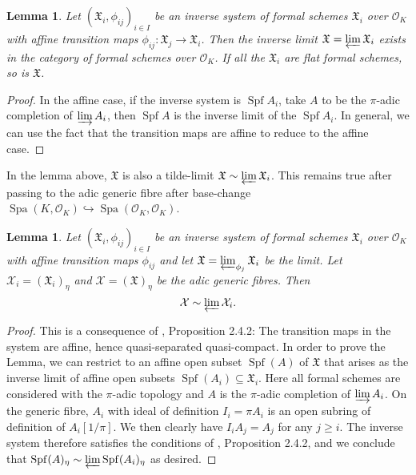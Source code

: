 \documentclass[10pt,oneside]{amsart}
\newtheorem{lemma}[theorem]{Lemma}
\theoremstyle{definition}
\begin{document}
	\begin{lemma} \label{lemma:inverse_limit_formal}
		Let $(\mathfrak X_i,\phi_{ij})_{i\in I}$ be an inverse system of formal schemes $\mathfrak X_i$ over $\mathcal O_K$ with affine transition maps $\phi_{ij}:\mathfrak X_j\rightarrow \mathfrak X_i$. Then the inverse limit $\mathfrak X=\varprojlim \mathfrak X_i$ exists in the category of formal schemes over $\mathcal O_K$. If all the $\mathfrak X_i$ are flat formal schemes, so is $\mathfrak X$.
	\end{lemma}
	\begin{proof}
	In the affine case, if the inverse system is $\operatorname{Spf} A_i$, take $A$ to be the $\pi$-adic completion of $\varinjlim A_i$, then  $\operatorname{Spf} A$ is the inverse limit of the $\operatorname{Spf}A_i$. In general, we can use the fact that the transition maps are affine to reduce to the affine case. 
	\end{proof}
	
	In the lemma above, $\mathfrak X$ is also a tilde-limit  $\mathfrak X\sim \varprojlim \mathfrak X_i$. This remains true after passing to the adic generic fibre after base-change $\operatorname{Spa}(K,\mathcal O_K)\hookrightarrow \operatorname{Spa}(\mathcal O_K,\mathcal O_K)$.
	
	\begin{lemma}\label{tilde-limit from adic generic fibre of formal schemes}
		Let $(\mathfrak X_i,\phi_{ij})_{i\in I}$ be an inverse system of formal schemes $\mathfrak X_i$ over $\mathcal O_K$ with affine transition maps $\phi_{ij}$ and let $\mathfrak X=\varprojlim_{\phi_j} \mathfrak X_i$ be the limit. Let $\mathcal X_i =(\mathfrak X_i)_\eta$ and  $\mathcal X = (\mathfrak X)_\eta$ be the adic generic fibres. Then
		\[\mathcal X \sim \varprojlim \mathcal X_i.\]
	\end{lemma}
	\begin{proof}
		This is a consequence of \cite{SW}, Proposition 2.4.2: The transition maps in the system are affine, hence quasi-separated quasi-compact. In order to prove the Lemma, we can restrict to an affine open subset $\operatorname{Spf}(A)$ of $\mathfrak X$ that arises as the inverse limit of affine open subsets $\operatorname{Spf}(A_i)\subseteq \mathfrak X_i$. Here all formal schemes are considered with the $\pi$-adic topology and $A$ is the $\pi$-adic completion of $\varinjlim A_i$. 
		On the generic fibre, $A_i$ with ideal of definition $I_i=\pi A_i$ is an open subring of definition of $A_i[1/\pi]$. We then clearly have $I_iA_j = A_j$ for any $j\geq i$. The inverse system therefore satisfies the conditions of \cite{SW}, Proposition 2.4.2, and we conclude that $\operatorname{Spf}(A)_\eta \sim \varprojlim \operatorname{Spf}(A_i)_\eta$ as desired.
	\end{proof}
	
\end{document}
